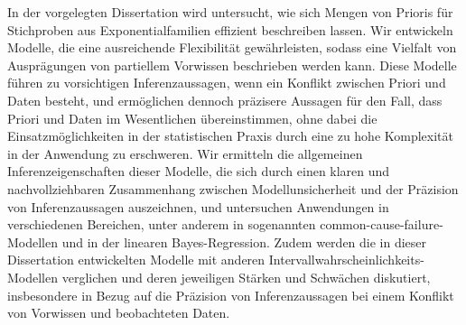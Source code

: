 In der vorgelegten Dissertation wird untersucht, wie sich Mengen von Prioris
für Stichproben aus Exponentialfamilien effizient beschreiben lassen.
Wir entwickeln Modelle, die eine ausreichende Flexibilität gewährleisten,
sodass eine Vielfalt von Ausprägungen von partiellem Vorwissen beschrieben werden kann.
Diese Modelle führen zu vorsichtigen Inferenzaussagen,
wenn ein Konflikt zwischen Priori und Daten besteht,
und ermöglichen dennoch präzisere Aussagen für den Fall, dass Priori und Daten im Wesentlichen übereinstimmen,
ohne dabei die Einsatzmöglichkeiten in der statistischen Praxis durch
eine zu hohe Komplexität in der Anwendung zu erschweren.
Wir ermitteln die allgemeinen Inferenz\-eigen\-schaften dieser Modelle,
die sich durch einen klaren und nachvollziehbaren Zusammenhang
zwischen Modellunsicherheit und der Präzision von Inferenzaussagen auszeichnen,
und untersuchen Anwendungen in verschiedenen Bereichen, unter anderem in sogenannten
common-cause-failure-Modellen und in der linearen Bayes-Regression.
Zudem werden die in dieser Dissertation entwickelten Modelle
mit anderen Intervallwahrscheinlichkeits-Modellen verglichen
und deren jeweiligen Stärken und Schwächen diskutiert,
insbesondere in Bezug auf die Präzision von Inferenzaussagen
bei einem Konflikt von Vorwissen und beobachteten Daten.

